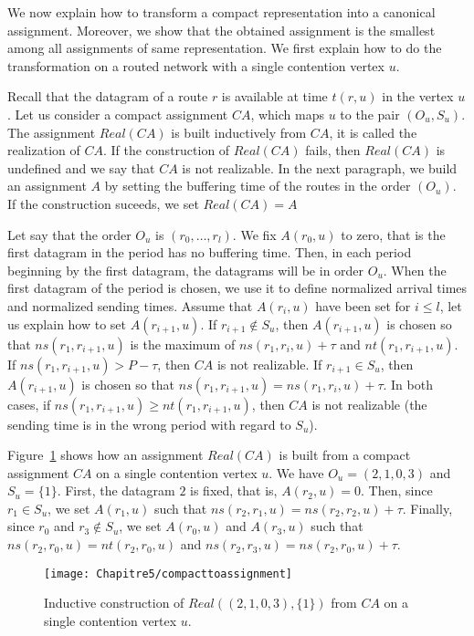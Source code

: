 We now explain how to transform a compact representation into a canonical assignment.
Moreover, we show that the obtained assignment is the smallest among all assignments of same representation. We first explain how to do the transformation on a routed network with a single contention vertex $u$.

Recall that the datagram of a route $r$ is available at time $t(r,u)$ in the vertex $u$.
Let us consider a compact assignment $CA$, which maps $u$ to the pair $(O_u,S_u)$.
The assignment $Real(CA)$ is built inductively from $CA$, it is called the realization of $CA$. 
If the construction of $Real(CA)$ fails, then $Real(CA)$ is undefined and we say that $CA$ is not realizable. In the next paragraph, we build an assignment $A$ by setting the buffering time of the routes in the order
 $(O_u)$. If the construction suceeds, we set $Real(CA) = A$ 

Let say that the order $O_u$ is $(r_0, \dots, r_l)$. We fix $A(r_0,u)$ to zero, that is the first
datagram in the period has no buffering time. Then, in each period beginning by the first datagram, the datagrams will be in order $O_u$. When the first datagram of the period is chosen, we use it to define normalized arrival times and normalized sending times.
Assume that $A(r_i,u)$ have been set for $i \leq l$, let us explain how to 
set $A(r_{i+1},u)$. If $r_{i+1} \notin S_u$, then $A(r_{i+1},u)$ is chosen so that $ns(r_1,r_{i+1},u)$ is the maximum of $ns(r_1,r_i,u) + \tau$ and $nt(r_1,r_{i+1},u)$. If $ns(r_1,r_{i+1},u) > P - \tau$, then $CA$ is not realizable. If $r_{i+1} \in S_u$, then $A(r_{i+1},u)$ is chosen so that $ns(r_1, r_{i+1},u) = ns(r_1,r_i,u) + \tau$. In both cases, if $ns(r_1, r_{i+1},u) \geq nt(r_1,r_{i+1},u)$, then $CA$ is not realizable (the sending time is in the wrong period with regard to $S_u$). 

Figure~\ref{fig:compacttoassignment} shows how an assignment $Real(CA)$ is built from a compact assignment $CA$ on a single contention vertex $u$. We have $O_u = (2,1,0,3)$ and $S_u = \{1\}$. First, the datagram $2$ is fixed, that is, $A(r_2,u)=0$. Then, since $r_1 \in S_u$, we set $A(r_1,u)$ such that $ ns(r_2,r_1,u) = ns(r_2,r_2,u) + \tau$. 
Finally, since $r_0$ and $r_3 \notin S_u$, we set $A(r_0,u)$ and $A(r_3,u)$ such that $ns(r_2,r_0,u) = nt(r_2,r_0,u)$ and  $ns(r_2,r_3,u) = ns(r_2,r_0,u) + \tau$.
\begin{figure}[!h]
	\centering
	\texttt{[image: Chapitre5/compacttoassignment]}
\caption{Inductive construction of $Real((2,1,0,3),\{1\})$ from $CA$ on a single contention vertex $u$. }
\label{fig:compacttoassignment} 
\end{figure}

